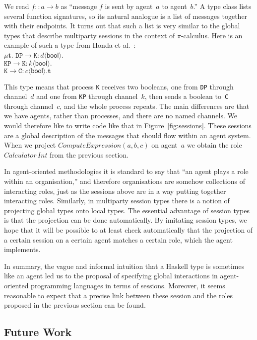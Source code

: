 \documentclass[a4paper,12pt,oneside]{book} %
\theoremstyle{remark}
\theoremstyle{plain}
\begin{document}
{\def\l#1->#2:#3<#4>{\mathtt{#1}\to\mathtt{#2}:#3\langle\mathsf{#4}\rangle}
We read $f::a\to b$ as ``message $f$ is sent by agent~$a$ to agent~$b$.'' A
type class lists several function signatures, so its natural analogue is a
list of messages together with their endpoints. It turns out that such a
list is very similar to the global types that describe multiparty sessions
in the context of $\pi$-calculus. Here is an example of such a type from
Honda et al.~\cite{dblp:conf/popl/hondayc08}:\\
$\mu\mathbf{t}.$
  $\l DP->K:d<bool>. $\\
  $\l KP->K:k<bool>. $\\
  $\l K->C:c<bool>.\mathbf{t}$

This type means that process \texttt{K} receives two booleans, one from
\texttt{DP} through channel~$d$ and one from \texttt{KP} through channel~$k$,
then sends a boolean to~\texttt{C} through channel~$c$, and the whole process
repeats. The main differences are that we have agents, rather than processes,
and there are no named channels. We would therefore like to write code like
that in Figure~\ref{fig:sessions}.  These sessions are a global description of
the messages that should flow within an agent system. When we project
$\mathit{ComputeExpression}(a,b,c)$ on agent~$a$ we obtain the role
$\mathit{Calculator}\,\mathit{Int}$ from the previous section.}

In agent-oriented methodologies it is standard to say that ``an agent plays
a role within an organisation,'' and therefore organisations are somehow
collections of interacting roles, just as the sessions above are in a way
putting together interacting roles. Similarly, in multiparty session types
there is a notion of projecting global types onto local types. The
essential advantage of session types is that the projection can be done
automatically. By imitating session types, we hope that it will be possible
to at least check automatically that the projection of a certain session on
a certain agent matches a certain role, which the agent implements.

In summary, the vague and informal intuition that a Haskell type is
sometimes like an agent led us to the proposal of specifying global
interactions in agent-oriented programming languages in terms of sessions.
Moreover, it seems reasonable to expect that a precise link between these
session and the roles proposed in the previous section can be found.
\subsection{Future Work} %
\end{document}
